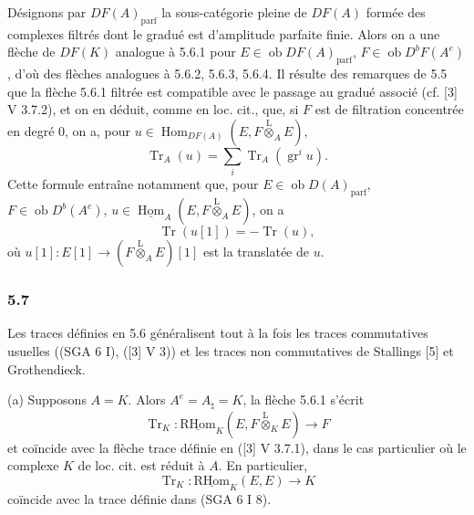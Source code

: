 \documentclass[11pt]{article}
\DeclareMathOperator{\Hom}{Hom}
\newcommand{\R}{\mathrm{R}}\newcommand{\RHomCore}{\mathrm{RHom}}
\newcommand{\ob}{\operatorname{ob}}
\providecommand{\RHom}{\RHomCore}
\providecommand{\uRHom}{\underline{\RHom}}
\providecommand{\uHom}{\underline{\Hom}}
\providecommand{\Tr}{\operatorname{Tr}}
\providecommand{\Tr}{\operatorname{Tr}}
\providecommand{\lten}{\overset{\mathrm L}{\otimes}}
\providecommand{\Tr}{\operatorname{Tr}}
\providecommand{\RHom}{\RHomCore}
\providecommand{\Hom}{\operatorname{Hom}}
\providecommand{\ob}{\operatorname{ob}}
\providecommand{\lten}{\overset{\mathrm L}{\otimes}}
\providecommand{\RHom}{\R\mathcal{H}om}
\providecommand{\lten}{\overset{\mathrm L}{\otimes}}
\providecommand{\R}{\mathrm R}
\providecommand{\Tr}{\operatorname{Tr}}
\providecommand{\lten}{\overset{\mathrm L}{\otimes}}
\providecommand{\lten}{\overset{\mathrm L}{\otimes}}
\providecommand{\lten}{\overset{\mathrm L}{\otimes}}
\providecommand{\RHom}{\RHomCore}
\providecommand{\Hom}{\operatorname{Hom}}
\providecommand{\Tr}{\operatorname{Tr}}
\providecommand{\lten}{\overset{\mathrm L}{\otimes}}
\begin{document}
Désignons par $DF(A)_{\mathrm{parf}}$ la sous-catégorie pleine de $DF(A)$ formée des complexes filtrés dont le gradué est d'amplitude parfaite finie. Alors on a une flèche de $DF(K)$ analogue à 5.6.1 pour $E\in\ob DF(A)_{\mathrm{parf}}$, $F\in\ob D^bF(A^e)$, d'où des flèches analogues à 5.6.2, 5.6.3, 5.6.4. Il résulte des remarques de 5.5 que la flèche 5.6.1 filtrée est compatible avec le passage au gradué associé (cf. [3] V 3.7.2), et on en déduit, comme en loc. cit., que, si $F$ est de filtration concentrée en degré $0$, on a, pour $u\in\Hom_{DF(A)}(E,F\lten_AE)$,
\begin{equation}\tag{5.6.5}
\Tr_A(u)=\sum_i\Tr_A(\operatorname{gr}^i u).
\end{equation}
Cette formule entraîne notamment que, pour $E\in\ob D(A)_{\mathrm{parf}}$, $F\in\ob D^b(A^e)$, $u\in\uHom_A(E,F\lten_AE)$, on a
\begin{equation}\tag{5.6.6}
\Tr(u[1])=-\Tr(u),
\end{equation}
où $u[1]:E[1]\to(F\lten_AE)[1]$ est la translatée de $u$.

\subsubsection*{5.7}

Les traces définies en 5.6 généralisent tout à la fois les traces commutatives usuelles ((SGA 6 I), ([3] V 3)) et les traces non commutatives de Stallings [5] et Grothendieck.

(a) Supposons $A=K$. Alors $A^e=A_\natural=K$, la flèche 5.6.1 s'écrit
\[
\Tr_K:\uRHom_K(E,F\lten_KE)\longrightarrow F
\]
et coïncide avec la flèche trace définie en ([3] V 3.7.1), dans le cas particulier où le complexe $K$ de loc. cit. est réduit à $A$. En particulier,
\[
\Tr_K:\uRHom_K(E,E)\longrightarrow K
\]
coïncide avec la trace définie dans (SGA 6 I 8).
\end{document}
